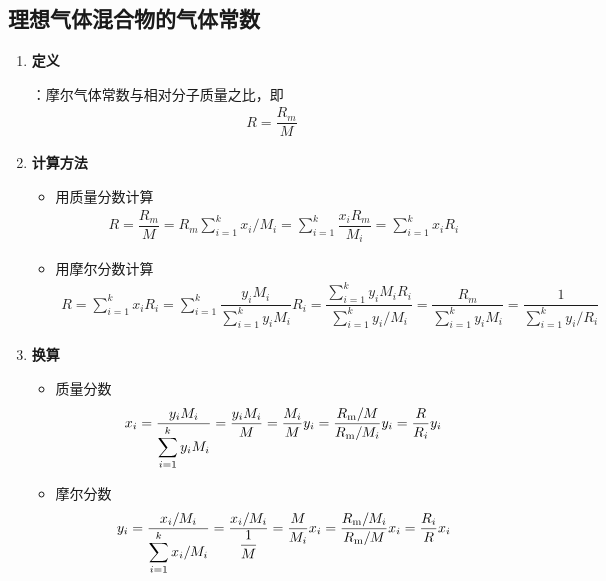 \subsection{理想气体混合物的气体常数
}
\begin{enumerate}[1.]
	\item \textbf{定义}
	
	：摩尔气体常数与相对分子质量之比，即
	\begin{align}
		R = \dfrac{R_m}{M}
	\end{align}
	
	\item \textbf{计算方法}
	\begin{itemize}
		\item 用质量分数计算
		\begin{align}
			R = \dfrac{R_m}{M} = R_m \sum_{i = 1}^k x_i /M_i= \sum_{i = 1}^k \dfrac{x_iR_m}{M_i} = \sum_{i = 1}^k x_i R_i
		\end{align}
		
		\item 用摩尔分数计算
		\begin{align}
			R = \sum_{i = 1}^k x_i R_i = \sum_{i = 1}^k \dfrac{y_i  M_i}{\displaystyle \sum_{i = 1}^k y_i  M_i} R_i = \dfrac{\displaystyle \sum_{i = 1}^k y_i M_i R_i}{\displaystyle \sum_{i = 1}^k y_i /M_i} = \dfrac{R_m}{\displaystyle \sum_{i = 1}^k y_i M_i} = \dfrac{1}{\displaystyle \sum_{i = 1}^k y_i/ R_i}
		\end{align}
	\end{itemize}
	
	\item \textbf{换算}	
	\begin{itemize}
		\item 质量分数
		\begin{align}
			x_i = \dfrac{y_i M_i}{\displaystyle \sum_{i = 1}^k y_i M_i} = \dfrac{y_i M_i}{M} = \dfrac{M_i}{M} y_i = \dfrac{R_{\text{m}} / M}{R_{\text{m}} / M_i} y_i = \dfrac{R}{R_i} y_i
		\end{align}
	
		\item 摩尔分数
		\begin{align}
			y_i = \dfrac{x_i / M_i}{\displaystyle \sum_{i = 1}^k  x_i /M_i} = \dfrac{x_i / M_i}{\dfrac{1}{M}} = \dfrac{M}{M_i} x_i = \dfrac{R_{\text{m}} / M_i}{R_{\text{m}} / M} x_i = \dfrac{R_i}{R} x_i
		\end{align}
	\end{itemize}
\end{enumerate}

